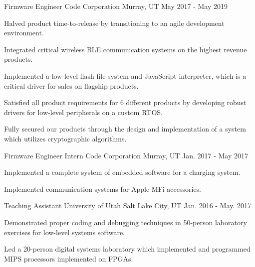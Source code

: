 \begin{cventries}

\cventry
{Firmware Engineer} %
{Code Corporation} %
{Murray, UT} %
{May 2017 - May 2019} %
{ %
\begin{cvitems}
\item Halved product time-to-release by transitioning to an agile development environment.
\item Integrated critical wireless BLE communication systems on the highest revenue products.
\item Implemented a low-level flash file system and JavaScript interpreter, which is a critical driver for sales on flagship products.
\item Satisfied all product requirements for 6 different products by developing robust drivers for low-level peripherals on a custom RTOS.
\item Fully secured our products through the design and implementation of a system which utilizes cryptographic algorithms.
\end{cvitems}
}


\cventry
{Firmware Engineer Intern} %
{Code Corporation} %
{Murray, UT} %
{Jan. 2017 - May 2017} %
{ %
\begin{cvitems}
\item Implemented a complete system of embedded software for a charging system.
\item Implemented communication systems for Apple MFi accessories.
\end{cvitems}
}


\cventry
{Teaching Assistant} %
{University of Utah} %
{Salt Lake City, UT} %
{Jan. 2016 - May. 2017} %
{ %
\begin{cvitems}
\item Demonstrated proper coding and debugging techniques in 50-person laboratory exercises for low-level systems software.
\item Led a 20-person digital systems laboratory which implemented and programmed MIPS processors implemented on FPGAs.
\end{cvitems}
}


\end{cventries}
